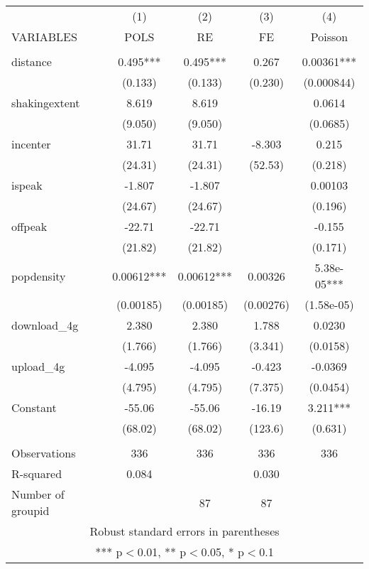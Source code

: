 \documentclass[]{article}
\begin{document}
\begin{tabular}{lcccc} \hline
 & (1) & (2) & (3) & (4) \\
VARIABLES & POLS & RE & FE & Poisson \\ \hline
 &  &  &  &  \\
distance & 0.495*** & 0.495*** & 0.267 & 0.00361*** \\
 & (0.133) & (0.133) & (0.230) & (0.000844) \\
shakingextent & 8.619 & 8.619 &  & 0.0614 \\
 & (9.050) & (9.050) &  & (0.0685) \\
incenter & 31.71 & 31.71 & -8.303 & 0.215 \\
 & (24.31) & (24.31) & (52.53) & (0.218) \\
ispeak & -1.807 & -1.807 &  & 0.00103 \\
 & (24.67) & (24.67) &  & (0.196) \\
offpeak & -22.71 & -22.71 &  & -0.155 \\
 & (21.82) & (21.82) &  & (0.171) \\
popdensity & 0.00612*** & 0.00612*** & 0.00326 & 5.38e-05*** \\
 & (0.00185) & (0.00185) & (0.00276) & (1.58e-05) \\
download\_4g & 2.380 & 2.380 & 1.788 & 0.0230 \\
 & (1.766) & (1.766) & (3.341) & (0.0158) \\
upload\_4g & -4.095 & -4.095 & -0.423 & -0.0369 \\
 & (4.795) & (4.795) & (7.375) & (0.0454) \\
Constant & -55.06 & -55.06 & -16.19 & 3.211*** \\
 & (68.02) & (68.02) & (123.6) & (0.631) \\
 &  &  &  &  \\
Observations & 336 & 336 & 336 & 336 \\
R-squared & 0.084 &  & 0.030 &  \\
 Number of groupid &  & 87 & 87 &  \\ \hline
\multicolumn{5}{c}{ Robust standard errors in parentheses} \\
\multicolumn{5}{c}{ *** p$<$0.01, ** p$<$0.05, * p$<$0.1} \\
\end{tabular}
\end{document}
